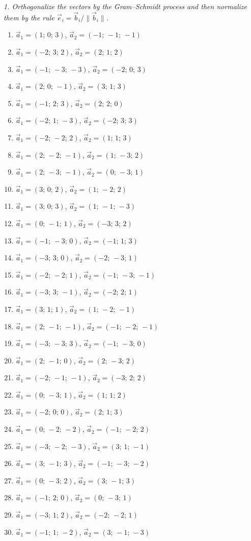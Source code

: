 \emph{1. Orthogonalize the vectors by the Gram–Schmidt process and then normalize them by the rule $\vec e_i=\vec b_i/\|\vec b_i\|$.}
\bigskip
\begin{enumerate}[label=\arabic*., leftmargin=*]
\item $\vec a_1=(1;\,0;\,3)$, $\vec a_2=(-1;\,-1;\,-1)$
\item $\vec a_1=(-2;\,3;\,2)$, $\vec a_2=(2;\,1;\,2)$
\item $\vec a_1=(-1;\,-3;\,-3)$, $\vec a_2=(-2;\,0;\,3)$
\item $\vec a_1=(2;\,0;\,-1)$, $\vec a_2=(3;\,1;\,3)$
\item $\vec a_1=(-1;\,2;\,3)$, $\vec a_2=(2;\,2;\,0)$
\item $\vec a_1=(-2;\,1;\,-3)$, $\vec a_2=(-2;\,3;\,3)$
\item $\vec a_1=(-2;\,-2;\,2)$, $\vec a_2=(1;\,1;\,3)$
\item $\vec a_1=(2;\,-2;\,-1)$, $\vec a_2=(1;\,-3;\,2)$
\item $\vec a_1=(2;\,-3;\,-1)$, $\vec a_2=(0;\,-3;\,1)$
\item $\vec a_1=(3;\,0;\,2)$, $\vec a_2=(1;\,-2;\,2)$
\item $\vec a_1=(3;\,0;\,3)$, $\vec a_2=(1;\,-1;\,-3)$
\item $\vec a_1=(0;\,-1;\,1)$, $\vec a_2=(-3;\,3;\,2)$
\item $\vec a_1=(-1;\,-3;\,0)$, $\vec a_2=(-1;\,1;\,3)$
\item $\vec a_1=(-3;\,3;\,0)$, $\vec a_2=(-2;\,-3;\,1)$
\item $\vec a_1=(-2;\,-2;\,1)$, $\vec a_2=(-1;\,-3;\,-1)$
\item $\vec a_1=(-3;\,3;\,-1)$, $\vec a_2=(-2;\,2;\,1)$
\item $\vec a_1=(3;\,1;\,1)$, $\vec a_2=(1;\,-2;\,-1)$
\item $\vec a_1=(2;\,-1;\,-1)$, $\vec a_2=(-1;\,-2;\,-1)$
\item $\vec a_1=(-3;\,-3;\,3)$, $\vec a_2=(-1;\,-3;\,0)$
\item $\vec a_1=(2;\,-1;\,0)$, $\vec a_2=(2;\,-3;\,2)$
\item $\vec a_1=(-2;\,-1;\,-1)$, $\vec a_2=(-3;\,2;\,2)$
\item $\vec a_1=(0;\,-3;\,1)$, $\vec a_2=(1;\,1;\,2)$
\item $\vec a_1=(-2;\,0;\,0)$, $\vec a_2=(2;\,1;\,3)$
\item $\vec a_1=(0;\,-2;\,-2)$, $\vec a_2=(-1;\,-2;\,2)$
\item $\vec a_1=(-3;\,-2;\,-3)$, $\vec a_2=(3;\,1;\,-1)$
\item $\vec a_1=(3;\,-1;\,3)$, $\vec a_2=(-1;\,-3;\,-2)$
\item $\vec a_1=(0;\,-3;\,2)$, $\vec a_2=(3;\,-1;\,3)$
\item $\vec a_1=(-1;\,2;\,0)$, $\vec a_2=(0;\,-3;\,1)$
\item $\vec a_1=(-3;\,1;\,2)$, $\vec a_2=(-2;\,-2;\,1)$
\item $\vec a_1=(-1;\,1;\,-2)$, $\vec a_2=(3;\,-1;\,-3)$
\end{enumerate}


